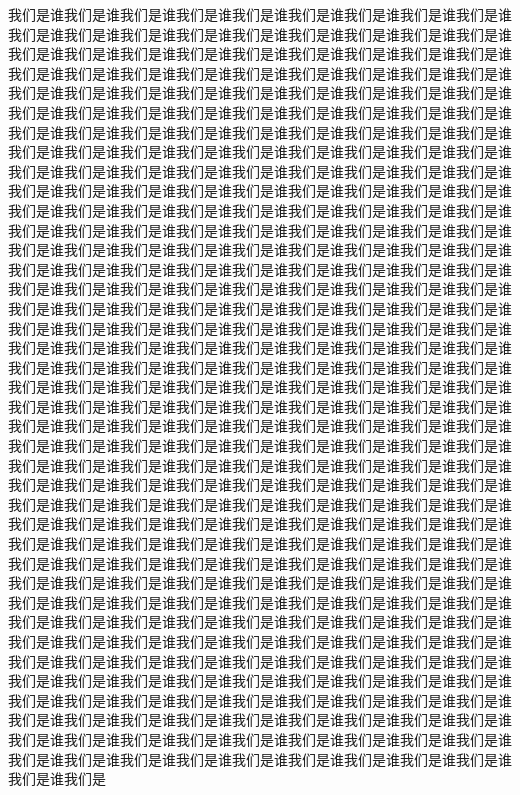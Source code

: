 \documentclass[twocolumn]{cvertbook}
\begin{document}
\tableofparts
\tableofcontents
我们是谁我们是谁我们是谁我们是谁我们是谁我们是谁我们是谁我们是谁我们是谁我们是谁我们是谁我们是谁我们是谁我们是谁我们是谁我们是谁我们是谁我们是谁我们是谁我们是谁我们是谁我们是谁我们是谁我们是谁我们是谁我们是谁我们是谁我们是谁我们是谁我们是谁我们是谁我们是谁我们是谁我们是谁我们是谁我们是谁我们是谁我们是谁我们是谁我们是谁我们是谁我们是谁我们是谁我们是谁我们是谁我们是谁我们是谁我们是谁我们是谁我们是谁我们是谁我们是谁我们是谁我们是谁我们是谁我们是谁我们是谁我们是谁我们是谁我们是谁我们是谁我们是谁我们是谁我们是谁我们是谁我们是谁我们是谁我们是谁我们是谁我们是谁我们是谁我们是谁我们是谁我们是谁我们是谁我们是谁我们是谁我们是谁我们是谁我们是谁我们是谁我们是谁我们是谁我们是谁我们是谁我们是谁我们是谁我们是谁我们是谁我们是谁我们是谁我们是谁我们是谁我们是谁我们是谁我们是谁我们是谁我们是谁我们是谁我们是谁我们是谁我们是谁我们是谁我们是谁我们是谁我们是谁我们是谁我们是谁我们是谁我们是谁我们是谁我们是谁我们是谁我们是谁我们是谁我们是谁我们是谁我们是谁我们是谁我们是谁我们是谁我们是谁我们是谁我们是谁我们是谁我们是谁我们是谁我们是谁我们是谁我们是谁我们是谁我们是谁我们是谁我们是谁我们是谁我们是谁我们是谁我们是谁我们是谁我们是谁我们是谁我们是谁我们是谁我们是谁我们是谁我们是谁我们是谁我们是谁我们是谁我们是谁我们是谁我们是谁我们是谁我们是谁我们是谁我们是谁我们是谁我们是谁我们是谁我们是谁我们是谁我们是谁我们是谁我们是谁我们是谁我们是谁我们是谁我们是谁我们是谁我们是谁我们是谁我们是谁我们是谁我们是谁我们是谁我们是谁我们是谁我们是谁我们是谁我们是谁我们是谁我们是谁我们是谁我们是谁我们是谁我们是谁我们是谁我们是谁我们是谁我们是谁我们是谁我们是谁我们是谁我们是谁我们是谁我们是谁我们是谁我们是谁我们是谁我们是谁我们是谁我们是谁我们是谁我们是谁我们是谁我们是谁我们是谁我们是谁我们是谁我们是谁我们是谁我们是谁我们是谁我们是谁我们是谁我们是谁我们是谁我们是谁我们是谁我们是谁我们是谁我们是谁我们是谁我们是谁我们是谁我们是谁我们是谁我们是谁我们是谁我们是谁我们是谁我们是谁我们是谁我们是谁我们是谁我们是谁我们是谁我们是谁我们是谁我们是谁我们是谁我们是谁我们是谁我们是谁我们是谁我们是谁我们是谁我们是谁我们是谁我们是谁我们是谁我们是谁我们是谁我们是谁我们是谁我们是谁我们是谁我们是谁我们是谁我们是谁我们是谁我们是谁我们是谁我们是谁我们是谁我们是谁我们是谁我们是谁我们是谁我们是谁我们是谁我们是谁我们是谁我们是谁我们是谁我们是谁我们是谁我们是谁我们是谁我们是谁我们是谁我们是谁我们是谁我们是谁我们是谁我们是谁我们是谁我们是谁我们是谁我们是谁我们是谁我们是谁我们是谁我们是谁我们是谁我们是谁我们是谁我们是谁我们是谁我们是谁我们是谁我们是谁我们是谁我们是谁我们是谁我们是谁我们是谁我们是谁我们是谁我们是谁我们是谁我们是谁我们是谁我们是谁我们是谁我们是谁我们是谁我们是谁我们是谁我们是谁我们是谁我们是谁我们是谁我们是谁我们是谁我们是谁我们是谁我们是谁我们是谁我们是谁我们是谁我们是谁我们是谁我们是谁我们是谁我们是谁我们是谁我们是谁我们是谁我们是谁我们是谁我们是谁我们是谁我们是谁我们是谁我们是谁我们是谁我们是谁我们是谁我们是谁我们是谁我们是谁我们是
\end{document}
